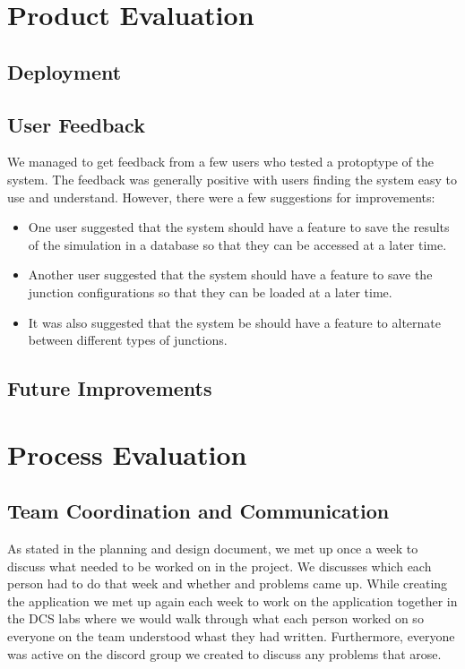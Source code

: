 \documentclass{article}
\begin{document}
    \section{Product Evaluation}

    \subsection{Deployment}

    \subsection{User Feedback}

    We managed to get feedback from a few users who tested a protoptype of the system. The feedback was generally positive with users finding the system easy to use and understand. However, there were a few suggestions for improvements:

    \begin{itemize}
        \item One user suggested that the system should have a feature to save the results of the simulation in a database so that they can be accessed at a later time.
        \item Another user suggested that the system should have a feature to save the junction configurations so that they can be loaded at a later time.
        \item It was also suggested that the system be should have a feature to alternate between different types of junctions.
    \end{itemize}

    \subsection{Future Improvements}


    \section{Process Evaluation}

    \subsection{Team Coordination and Communication}
    As stated in the planning and design document, we met up once a week to discuss what needed to be worked on in the project. We discusses which each person had to do that week and whether and problems came up. While creating the application we met up again each week to work on the application together in the DCS labs where we would walk through what each person worked on so everyone on the team understood whast they had written. Furthermore, everyone was active on the discord group we created to discuss any problems that arose.
\end{document}
